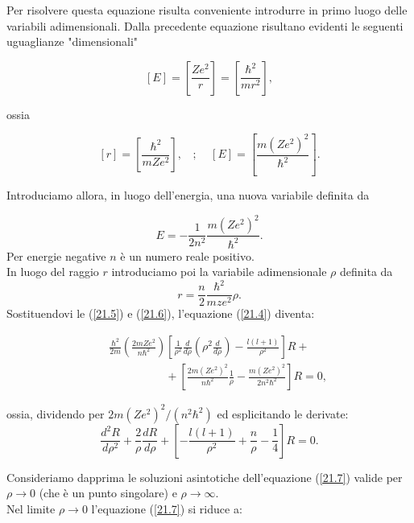 \documentclass[a4paper,12pt,oneside]{book}
\begin{document}
Per risolvere questa equazione risulta conveniente introdurre in primo luogo delle variabili adimensionali. Dalla precedente equazione risultano evidenti le seguenti uguaglianze "dimensionali"

\begin{equation}
\left[E\right]=\left[\frac{Ze^2}{r}\right]=\left[\frac{\hbar^2}{mr^2}\right] ,
\end{equation}

ossia

\begin{equation}
\left[r\right]=\left[\frac{\hbar^2}{mZe^2}\right] , \ \ \ \ ;\ \ \ \ \ \left[E\right]=\left[\frac{m\left(Ze^2\right)^2}{\hbar^2}\right] .
\end{equation}

Introduciamo allora, in luogo dell'energia, una nuova variabile definita da

\begin{equation}
E=-\frac{1}{2n^2}\frac{m\left(Ze^2\right)^2}{\hbar^2} .
\label{21.5}
\end{equation}
Per energie negative $n$ è un numero reale positivo.\\
In luogo del raggio $r$ introduciamo poi la variabile adimensionale $\rho$ definita da 
\begin{equation}
r=\frac{n}{2}\frac{\hbar^2}{mze^2}\rho .
\label{21.6}
\end{equation}
Sostituendovi le (\ref{21.5}) e (\ref{21.6}), l'equazione (\ref{21.4}) diventa:

\begin{eqnarray}
& & \frac{\hbar^2}{2m}\left(\frac{2mZe^2}{n\hbar^2}\right)\left[\frac{1}{\rho^2}\frac{d}{d\rho}\left(\rho^2\frac{d}{d\rho}\right)-\frac{l\left(l+1\right)}{\rho^2}\right]R +\nonumber \\
& & \qquad \qquad \quad +\left[\frac{2m\left(Ze^2\right)^2}{n\hbar^2}\frac{1}{\rho}-\frac{m\left(Ze^2\right)^2}{2n^2\hbar^2}\right]R=0 ,
\end{eqnarray}

ossia, dividendo per $2m\left(Ze^2\right)^2/\left(n^2\hbar^2\right)$ ed esplicitando le derivate:
\begin{equation}
\frac{d^2R}{d\rho^2}+\frac{2}{\rho}\frac{dR}{d\rho}+\left[-\frac{l\left(l+1\right)}{\rho^2}+\frac{n}{\rho}-\frac{1}{4}\right]R=0 .
\label{21.7}
\end{equation}

Consideriamo dapprima le soluzioni asintotiche dell'equazione (\ref{21.7}) valide per $\rho\rightarrow0$ (che è un punto singolare) e $\rho\rightarrow\infty$.\\
Nel limite $\rho\rightarrow0$ l'equazione (\ref{21.7}) si riduce a:
\end{document}
